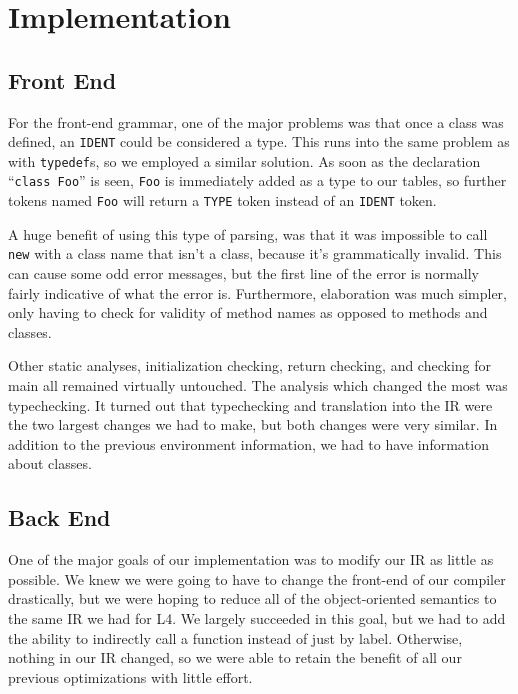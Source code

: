 \documentclass{article}
\begin{document}
\section{Implementation}

\subsection{Front End}

For the front-end grammar, one of the major problems was that once a class was
defined, an \texttt{IDENT} could be considered a type. This runs into the same
problem as with \texttt{typedef}s, so we employed a similar solution. As soon
as the declaration ``\texttt{class Foo}'' is seen, \texttt{Foo} is immediately
added as a type to our tables, so further tokens named \texttt{Foo} will return
a \texttt{TYPE} token instead of an \texttt{IDENT} token.

A huge benefit of using this type of parsing, was that it was impossible to
call \texttt{new} with a class name that isn't a class, because it's
grammatically invalid. This can cause some odd error messages, but the first
line of the error is normally fairly indicative of what the error is.
Furthermore, elaboration was much simpler, only having to check for validity
of method names as opposed to methods and classes.

Other static analyses, initialization checking, return checking, and checking
for main all remained virtually untouched. The analysis which changed the most
was typechecking. It turned out that typechecking and translation into the IR
were the two largest changes we had to make, but both changes were very similar.
In addition to the previous environment information, we had to have information
about classes.

\subsection{Back End}

One of the major goals of our implementation was to modify our IR as little as
possible. We knew we were going to have to change the front-end of our compiler
drastically, but we were hoping to reduce all of the object-oriented semantics
to the same IR we had for L4. We largely succeeded in this goal, but we had to
add the ability to indirectly call a function instead of just by label.
Otherwise, nothing in our IR changed, so we were able to retain the benefit of
all our previous optimizations with little effort.
\end{document}
